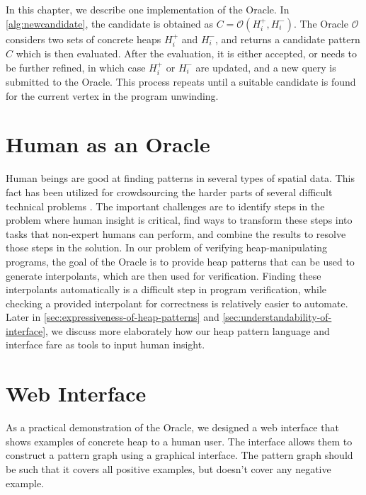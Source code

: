 \label{ch:interface-oracle}

In this chapter, we describe one implementation of the Oracle. In \autoref{alg:newcandidate}, the candidate is obtained as $C = \mathcal{O}(H_i^{+}, H_i^{-})$. The Oracle $\mathcal{O}$ considers two sets of concrete heaps $H_i^{+}$ and $H_i^{-}$, and returns a candidate pattern $C$ which is then evaluated. After the evaluation, it is either accepted, or needs to be further refined, in which case $H_i^{+}$ or $H_i^{-}$ are updated, and a new query is submitted to the Oracle. This process repeats until a suitable candidate is found for the current vertex in the program unwinding.

\section{Human as an Oracle}
Human beings are good at finding patterns in several types of spatial data. This fact has been utilized for crowdsourcing the harder parts of several difficult technical problems \cite{wenchao2012, verigames, eyewire}. The important challenges are to identify steps in the problem where human insight is critical, find ways to transform these steps into tasks that non-expert humans can perform, and combine the results to resolve those steps in the solution. In our problem of verifying heap-manipulating programs, the goal of the Oracle is to provide heap patterns that can be used to generate interpolants, which are then used for verification. Finding these interpolants automatically is a difficult step in program verification, while checking a provided interpolant for correctness is relatively easier to automate. Later in \autoref{sec:expressiveness-of-heap-patterns} and \autoref{sec:understandability-of-interface}, we discuss more elaborately how our heap pattern language and interface fare as tools to input human insight.

\section{Web Interface}
\label{sec:web-interface}
As a practical demonstration of the Oracle, we designed a web interface that shows examples of concrete heap to a human user. The interface allows them to construct a pattern graph using a graphical interface. The pattern graph should be such that it covers all positive examples, but doesn't cover any negative example.

